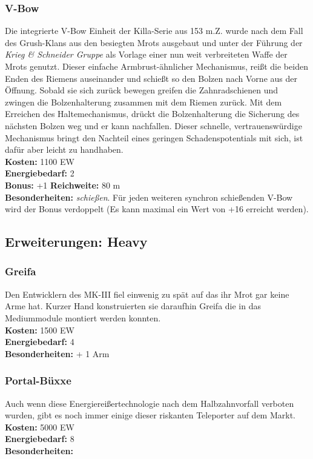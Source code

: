 \subsubsection*{V-Bow}
Die integrierte V-Bow Einheit der Killa-Serie aus 153 m.Z. wurde nach dem Fall des Grush-Klans aus den besiegten Mrots ausgebaut und unter der Führung der \textit{Krieg \& Schneider Gruppe} als Vorlage einer nun weit verbreiteten Waffe der Mrots genutzt. Dieser einfache Armbrust-ähnlicher Mechanismus, reißt die beiden Enden des Riemens auseinander und schießt so den Bolzen nach Vorne aus der Öffnung. Sobald sie sich zurück bewegen greifen die Zahnradschienen und zwingen die Bolzenhalterung zusammen mit dem Riemen zurück. Mit dem Erreichen des Haltemechanismus, drückt die Bolzenhalterung die Sicherung des nächsten Bolzen weg und er kann nachfallen. Dieser schnelle, vertrauenswürdige Mechanismus bringt den Nachteil eines geringen Schadenspotentials mit sich, ist dafür aber leicht zu handhaben. \\
\textbf{Kosten:} 1100 EW\\
\textbf{Energiebedarf:} 2 \\
\textbf{Bonus:} +1
\textbf{Reichweite:} 80 m\\
\textbf{Besonderheiten:} \textit{schießen}. Für jeden weiteren synchron schießenden V-Bow wird der Bonus verdoppelt (Es kann maximal ein Wert von +16 erreicht werden).

\subsection*{Erweiterungen: Heavy}

\subsubsection*{Greifa}
Den Entwicklern des MK-III fiel einwenig zu spät auf das ihr Mrot gar keine Arme hat. Kurzer Hand konstruierten sie daraufhin Greifa die in das Mediummodule montiert werden konnten. \\
\textbf{Kosten:} 1500 EW\\
\textbf{Energiebedarf:} 4 \\
\textbf{Besonderheiten:} + 1 Arm

\subsubsection*{Portal-Büxxe}
Auch wenn diese Energiereißertechnologie nach dem Halbzahnvorfall verboten wurden, gibt es noch immer einige dieser riskanten Teleporter auf dem Markt. \\
\textbf{Kosten:} 5000 EW\\
\textbf{Energiebedarf:} 8 \\
\textbf{Besonderheiten:} \textit{}

